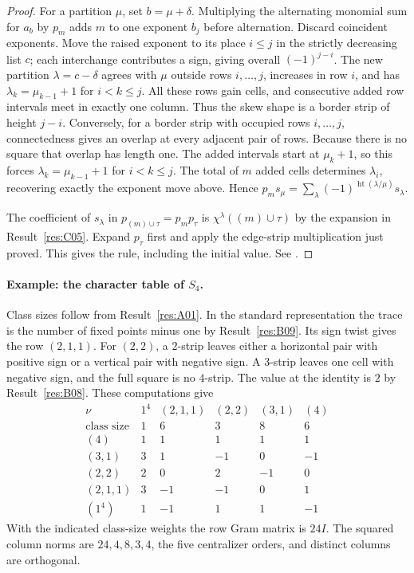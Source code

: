 \begin{proof}
For a partition \(\mu\), set \(b=\mu+\delta\). Multiplying the
alternating monomial sum for \(a_b\) by \(p_m\) adds \(m\) to one
exponent \(b_j\) before alternation. Discard coincident exponents.
Move the raised exponent to its place \(i\le j\) in the strictly
decreasing list \(c\); each interchange contributes a sign, giving
overall \((-1)^{j-i}\). The new partition \(\lambda=c-\delta\)
agrees with \(\mu\) outside rows \(i,\ldots,j\), increases in row
\(i\), and has
\(\lambda_k=\mu_{k-1}+1\) for \(i<k\le j\). All these rows gain
cells, and consecutive added row intervals meet in exactly one
column. Thus the skew shape is a border strip of height \(j-i\).
Conversely, for a border strip with occupied rows \(i,\ldots,j\),
connectedness gives an overlap at every adjacent pair of rows.
Because there is no square that overlap has length one.
The added intervals start at \(\mu_k+1\), so this forces
\(\lambda_k=\mu_{k-1}+1\) for \(i<k\le j\).
The total of \(m\) added cells determines \(\lambda_i\), recovering
exactly the exponent move above. Hence
\(p_m s_\mu=\sum_\lambda(-1)^{\operatorname{ht}(\lambda/\mu)}s_\lambda\).

The coefficient of \(s_\lambda\) in \(p_{(m)\cup\tau}=p_m p_\tau\)
is \(\chi^\lambda((m)\cup\tau)\) by the expansion in
Result~\ref{res:C05}. Expand \(p_\tau\) first and apply the
edge-strip multiplication just proved. This gives the rule,
including the initial value. See \cite[Section 4.10]{sagan}.
\end{proof}

\paragraph{Example: the character table of \(S_4\).}
Class sizes follow from Result~\ref{res:A01}. In the standard
representation the trace is the number of fixed points minus one
by Result~\ref{res:B09}. Its sign twist gives the row \((2,1,1)\).
For \((2,2)\), a \(2\)-strip leaves either a horizontal pair with
positive sign or a vertical pair with negative sign. A \(3\)-strip
leaves one cell with negative sign, and the full square is no
\(4\)-strip. The value at the identity is \(2\) by
Result~\ref{res:B08}. These computations give
\[
\begin{array}{c|rrrrr}
 \nu & 1^4 & (2,1,1) & (2,2) & (3,1) & (4)\\ \hline
 \text{class size} & 1 & 6 & 3 & 8 & 6\\ \hline
 (4)     &1& 1& 1& 1& 1\\
 (3,1)   &3& 1&-1& 0&-1\\
 (2,2)   &2& 0& 2&-1& 0\\
 (2,1,1) &3&-1&-1& 0& 1\\
 (1^4)   &1&-1& 1& 1&-1
\end{array}
\]
With the indicated class-size weights the row Gram matrix is
\(24I\). The squared column norms are \(24,4,8,3,4\), the five
centralizer orders, and distinct columns are orthogonal.

